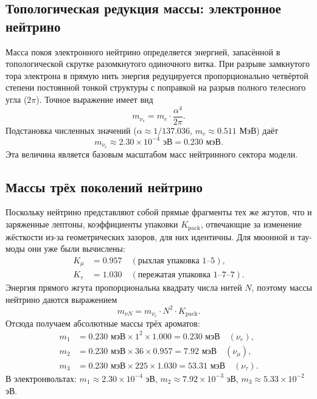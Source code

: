 \documentclass[12pt,a4paper]{article}
\begin{document}
\subsection{Топологическая редукция массы: электронное нейтрино}
Масса покоя электронного нейтрино определяется энергией, запасённой в топологической скрутке разомкнутого одиночного витка. При разрыве замкнутого тора электрона в прямую нить энергия редуцируется пропорционально четвёртой степени постоянной тонкой структуры с поправкой на разрыв полного телесного угла ($2\pi$). Точное выражение имеет вид
\begin{equation}
m_{\nu_e} = m_e \cdot \frac{\alpha^4}{2\pi}.
\end{equation}
Подстановка численных значений ($\alpha \approx 1/137.036$, $m_e \approx 0.511$ МэВ) даёт
\begin{equation}
m_{\nu_e} \approx 2.30 \times 10^{-4} \text{ эВ} = 0.230 \text{ мэВ}.
\end{equation}
Эта величина является базовым масштабом масс нейтринного сектора модели.

\subsection{Массы трёх поколений нейтрино}
Поскольку нейтрино представляют собой прямые фрагменты тех же жгутов, что и заряженные лептоны, коэффициенты упаковки $K_{\text{pack}}$, отвечающие за изменение жёсткости из-за геометрических зазоров, для них идентичны. Для мюонной и тау-моды они уже были вычислены:
\begin{align}
K_\mu &= 0.957 \quad (\text{рыхлая упаковка 1--5}), \\
K_\tau &= 1.030 \quad (\text{пережатая упаковка 1--7--7}).
\end{align}
Энергия прямого жгута пропорциональна квадрату числа нитей $N$, поэтому массы нейтрино даются выражением
\begin{equation}
m_{\nu N} = m_{\nu_e} \cdot N^2 \cdot K_{\text{pack}}.
\end{equation}
Отсюда получаем абсолютные массы трёх ароматов:
\begin{align}
m_1 &= 0.230 \text{ мэВ} \times 1^2 \times 1.000 = 0.230 \text{ мэВ} \quad (\nu_e), \\
m_2 &= 0.230 \text{ мэВ} \times 36 \times 0.957 = 7.92 \text{ мэВ} \quad (\nu_\mu), \\
m_3 &= 0.230 \text{ мэВ} \times 225 \times 1.030 = 53.31 \text{ мэВ} \quad (\nu_\tau).
\end{align}
В электронвольтах: $m_1 \approx 2.30\times10^{-4}$ эВ, $m_2 \approx 7.92\times10^{-3}$ эВ, $m_3 \approx 5.33\times10^{-2}$ эВ.
\end{document}
